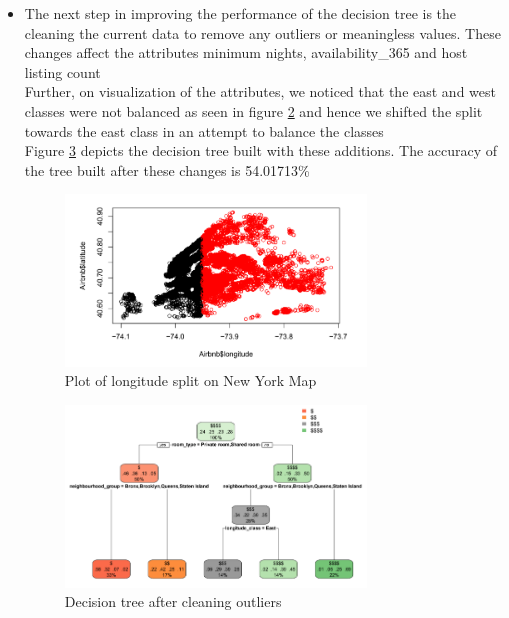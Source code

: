\documentclass{sig-alternate}
\begin{document}
\begin{itemize}
\begin{figure}[ht]
		\label{decision2}
		\centering
	\end{figure}
	\item The next step in improving the performance of the decision tree is the cleaning the current data to remove any outliers or meaningless values. These changes affect the attributes minimum nights, availability\_365 and host listing count\\
	Further, on visualization of the attributes, we noticed that the east and west classes were not balanced as seen in figure \ref{longsplit} and hence we shifted the split towards the east class in an attempt to balance the classes\\
	Figure \ref{decision3} depicts the decision tree built with these additions. The accuracy of the tree built after these changes is 54.01713\%
	\begin{figure}[ht]
		\includegraphics[width=8cm]{longsplit.PNG}
		\caption{Plot of longitude split on New York Map}
		\label{longsplit}
		\centering
	\end{figure}
	\begin{figure}[ht]
		\includegraphics[width=8cm]{decision3.PNG}
		\caption{Decision tree after cleaning outliers}
		\label{decision3}
		\centering
	\end{figure}
	\end{itemize}
\end{document}
